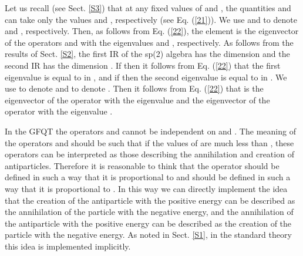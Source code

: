 \documentclass[a4paper,12pt]{article}%
\begin{document}
Let us recall (see Sect. \ref{S3}) that at any fixed
values of \coordHE{} and \coordHE{}, the quantities \coordHE{} and \coordHE{}
can take only the values \coordHE{} and
\coordHE{}, respectively (see Eq. (\ref{21})).
We use \coordHE{} and \coordHE{} to denote \coordHE{}
and \coordHE{}, respectively. Then, as follows from Eq.
(\ref{22}), the element \coordHE{} is the eigenvector
of the operators \coordHE{} and \coordHE{} with the eigenvalues
\coordHE{} and \coordHE{}, respectively. 
As follows from the results of Sect. \ref{S2}, the first IR
of the sp(2) algebra has the dimension \coordHE{} and the 
second IR has the dimension \coordHE{}. If \coordHE{} 
then it follows from Eq. (\ref{22}) that the first 
eigenvalue is equal to \coordHE{} in \coordHE{}, and if 
\coordHE{} then 
the second eigenvalue is equal to \coordHE{} in \coordHE{}.
We use \coordHE{} to denote \coordHE{} and 
\coordHE{} to denote 
\coordHE{}. Then it follows from Eq. (\ref{22}) that
\coordHE{} is the 
eigenvector  
of the operator \coordHE{} with the eigenvalue \coordHE{} 
and the 
eigenvector of the operator \coordHE{} with the eigenvalue 
\coordHE{}. 

In the GFQT the operators \coordHE{} and 
\coordHE{} cannot be independent on
\coordHE{} and \coordHE{}. The meaning of
the operators \coordHE{} and \coordHE{}
should be such that if the values of \coordHE{} are
much less than \coordHE{}, these operators can be interpreted
as those describing the annihilation and creation of
antiparticles. Therefore it is reasonable to think that the 
operator \coordHE{} should be defined in such a way that
it is proportional to \coordHE{}
and \coordHE{} should be defined in such a way that
it is proportional to \coordHE{}. 
In this way we can directly implement the idea that the
creation of the antiparticle with the positive energy
can be described as the annihilation of the particle with the
negative energy, and the annihilation of the antiparticle 
with the positive energy can be described as the creation of 
the particle with the negative energy. As noted in Sect.
\ref{S1}, in the standard theory this idea is implemented 
implicitly.   
\end{document}
